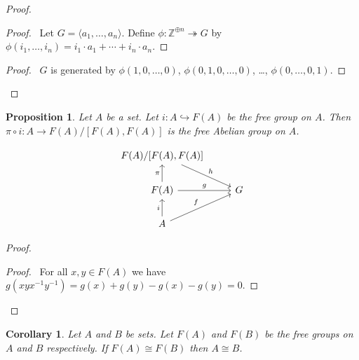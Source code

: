 \documentclass{book}
\let\qed\relax
\newtheorem{prop}{Proposition}[chapter]
\newtheorem{cor}{Corollary}[prop]
\theoremstyle{definition}
\newcommand{\inv}[1]{\ensuremath{{#1}^{-1}}}
\begin{document}
\begin{proof}
\pf
{}
\begin{proof}
	\pf\ Let $G = \langle a_1, \ldots, a_n \rangle$. Define $\phi : \mathbb{Z}^{\oplus n} \twoheadrightarrow G$ by $\phi(i_1, \ldots, i_n) = i_1 \cdot a_1 + \cdots + i_n \cdot a_n$.
\end{proof}
\begin{proof}
	\pf\ $G$ is generated by $\phi(1, 0, \ldots, 0)$, $\phi(0, 1, 0, \ldots, 0)$, \ldots, $\phi(0, \ldots, 0, 1)$.
\end{proof}
\qed
\end{proof}

\begin{prop}
Let $A$ be a set. Let $i : A \hookrightarrow F(A)$ be the free group on $A$. Then $\pi \circ i : A \rightarrow F(A) / [F(A),F(A)]$ is the free Abelian group on $A$.
\end{prop}

\[ \begin{tikzcd}
F(A)/[F(A),F(A)] \arrow[dr,"h"] \\
F(A) \arrow[r,"g"] \arrow[u,"\pi"] & G \\
A \arrow[u,"i"] \arrow[ur,"f"]
\end{tikzcd} \]

\begin{proof}
\pf
{}
\begin{proof}
	\pf\ For all $x,y \in F(A)$ we have $g(xy\inv{x}\inv{y}) = g(x) + g(y) - g(x) - g(y) = 0$.
\end{proof}
\qed
\end{proof}

\begin{cor}
Let $A$ and $B$ be sets. Let $F(A)$ and $F(B)$ be the free groups on $A$ and $B$ respectively. If $F(A) \cong F(B)$ then $A \cong B$.
\end{cor}
\end{document}
